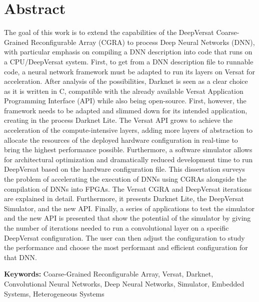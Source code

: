 
\section*{Abstract}


The goal of this work is to extend the capabilities of the DeepVersat Coarse-Grained Reconfigurable Array (CGRA) to
process Deep Neural Networks (DNN), with particular emphasis on compiling a DNN description into code that runs on a 
CPU/DeepVersat system.
First, to get from a DNN description file to runnable code, a neural network framework must be adapted to run its layers
on Versat for acceleration. After analysis of the possibilities, Darknet is seen as a clear choice as it is written in C, compatible
with the already available Versat Application Programming Interface (API) while also being open-source. First, however, the framework needs to be adapted and slimmed down for its intended application, creating in the process Darknet Lite.
The Versat API grows to achieve the acceleration of the compute-intensive layers, adding more layers of abstraction to allocate the resources
of the deployed hardware configuration in real-time to bring the highest performance possible. Furthermore, a software simulator allows for architectural optimization and dramatically reduced development time
to run DeepVersat based on the hardware configuration file.
This dissertation surveys the problem of accelerating the execution of DNNs using CGRAs alongside the compilation of DNNs into FPGAs. The Versat CGRA and DeepVersat iterations are explained in detail.
Furthermore, it presents Darknet Lite, the DeepVersat Simulator, and the new API. Finally, a series of applications to test the simulator and the new API is presented that show the potential
of the simulator by giving the number of iterations needed to run a convolutional layer on a specific DeepVersat configuration. The user can then adjust the configuration to study the performance
and choose the most performant and efficient configuration for that DNN.



\vfill

\textbf{\Large Keywords:} Coarse-Grained Reconfigurable Array, Versat, Darknet, Convolutional Neural Networks, Deep Neural Networks, Simulator, Embedded Systems, Heterogeneous Systems
